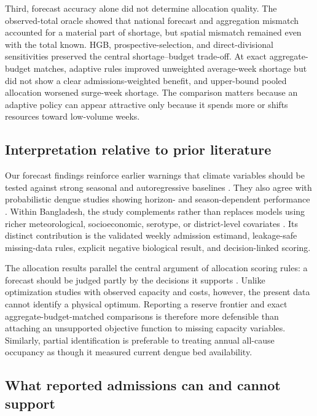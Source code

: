 \documentclass[11pt]{article}
\begin{document}
Third, forecast accuracy alone did not determine allocation quality. The observed-total oracle showed that national forecast and aggregation mismatch accounted for a material part of shortage, but spatial mismatch remained even with the total known. HGB, prospective-selection, and direct-divisional sensitivities preserved the central shortage--budget trade-off. At exact aggregate-budget matches, adaptive rules improved unweighted average-week shortage but did not show a clear admissions-weighted benefit, and upper-bound pooled allocation worsened surge-week shortage. The comparison matters because an adaptive policy can appear attractive only because it spends more or shifts resources toward low-volume weeks.

\subsection{Interpretation relative to prior literature}

Our forecast findings reinforce earlier warnings that climate variables should be tested against strong seasonal and autoregressive baselines \citep{johansson2016,leung2023}. They also agree with probabilistic dengue studies showing horizon- and season-dependent performance \citep{johansson2019,colon2021}. Within Bangladesh, the study complements rather than replaces models using richer meteorological, socioeconomic, serotype, or district-level covariates \citep{dey2022,mobin2024,rahman2025,faruk2026,fuad2026}. Its distinct contribution is the validated weekly admission estimand, leakage-safe missing-data rules, explicit negative biological result, and decision-linked scoring.

The allocation results parallel the central argument of allocation scoring rules: a forecast should be judged partly by the decisions it supports \citep{gerding2024}. Unlike optimization studies with observed capacity and costs, however, the present data cannot identify a physical optimum. Reporting a reserve frontier and exact aggregate-budget-matched comparisons is therefore more defensible than attaching an unsupported objective function to missing capacity variables. Similarly, partial identification is preferable to treating annual all-cause occupancy as though it measured current dengue bed availability.

\subsection{What reported admissions can and cannot support}
\end{document}
